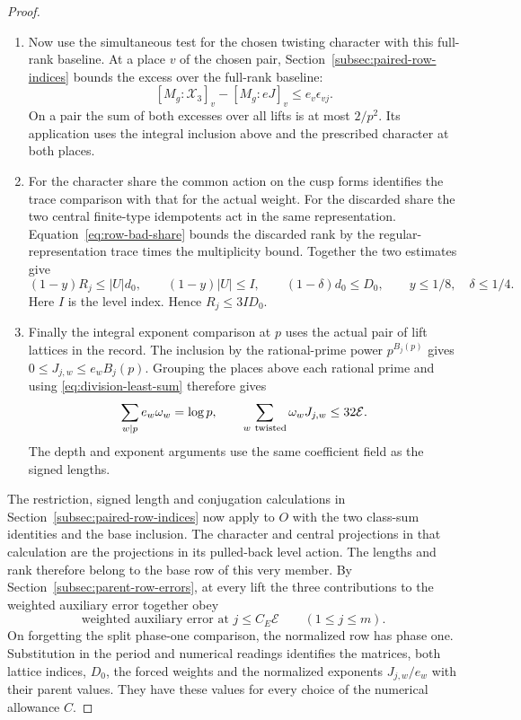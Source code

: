\begin{proof}
\begin{enumerate}
For the character \(\chi\) and a vector \(v\) in its
space, the unnormalized trace and its projected image are
\[
      \sum_{u\in U}\chi(u)^{-1}uv=|U|v,\qquad
      e\sum_{u\in U}\chi(u)^{-1}uv=|U|ev .
\]
The short sections span the character space over the
fraction field. Since \(|U|\ne0\), their projected
traces give the full generic good space of \(eJ\). Apply this also at the conjugate place, using
the same off-prime choice. \label{cor:joint-family-estimate-7}
\item Now use the simultaneous test for the chosen twisting
character with this full-rank baseline. At a place \(v\) of the chosen pair, Section~\ref{subsec:paired-row-indices} bounds the excess over the full-rank baseline:
\[
 [M_g:\mathcal X_3]_v-[M_g:eJ]_v\le e_v\epsilon_{vj}.
\]
On a pair the sum of both excesses over all lifts is at most
\(2/p^2\). Its application uses the integral inclusion above
and the prescribed character at both places.
\item For the character share the common action on the cusp
forms identifies the trace comparison with that for the
actual weight. For the discarded share the two central
finite-type idempotents act in the same representation.
Equation~\eqref{eq:row-bad-share} bounds the discarded rank by
the regular-representation trace times the multiplicity bound.
Together the two estimates give
\[
 (1-y)R_j\le|U|d_0,\qquad (1-y)|U|\le I,\qquad
 (1-\delta)d_0\le D_0,\qquad y\le1/8,\quad\delta\le1/4 .
\]
Here \(I\) is the level index. Hence \(R_j\le3 I D_0\).
\item Finally the integral exponent comparison at \(p\) uses
the actual pair of lift lattices in the record. The inclusion
by the rational-prime power \(p^{B_j(p)}\) gives
\(0\le J_{j,w}\le e_w B_j(p)\). Grouping the places above each rational prime and using \eqref{eq:division-least-sum} therefore gives
\[
 \sum_{w\mid p}e_w\omega_w=\log p,\qquad \sum_{w\ {\rm twisted}}\omega_w J_{j,w}\le32\mathcal E .
\] The depth and exponent
arguments use the same coefficient field as the signed lengths.
\end{enumerate}

The restriction, signed length and conjugation calculations in
Section~\ref{subsec:paired-row-indices} now apply to \(O\) with
the two class-sum identities and the base inclusion. The character
and central projections in that calculation are the projections
in its pulled-back level action. The lengths and rank therefore
belong to the base row of this very member. By Section~\ref{subsec:parent-row-errors}, at every lift the three contributions to the weighted auxiliary error together obey
\[
 \text{weighted auxiliary error at }j\le C_E\mathcal E\qquad(1\le j\le m).
\] On forgetting the split phase-one comparison,
the normalized row has phase one. Substitution in the period
and numerical readings identifies the matrices, both
lattice indices, \(D_0\), the forced weights and the normalized
exponents \(J_{j,w}/e_w\) with their parent values.
They have these values for every choice of the numerical
allowance \(C\).


\end{proof}
